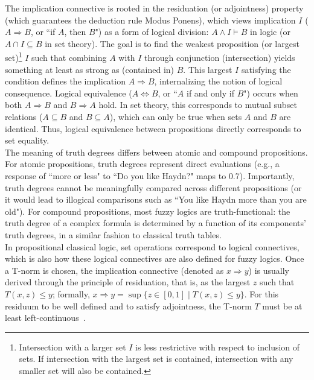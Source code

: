 The implication connective is rooted in the residuation (or adjointness) property (which guarantees the deduction rule Modus Ponens), which views implication $I$ ($A \Rightarrow B$, or ``if $A$, then $B$") as a form of logical division: $A \land I \models B$ in logic (or $A \cap I \subseteq B$ in set theory). The goal is to find the weakest proposition (or largest set)\footnote{Intersection with a larger set $I$ is less restrictive with respect to inclusion of sets. If intersection with the largest set is contained, intersection with any smaller set will also be contained.} $I$ such that combining $A$ with $I$ through conjunction (intersection) yields something at least as strong as (contained in) $B$. This largest $I$ satisfying the condition defines the implication $A \Rightarrow B$, internalizing the notion of logical consequence. Logical equivalence ($A \iff B$, or ``$A$ if and only if $B$") occurs when both $A \Rightarrow B$ and $B \Rightarrow A$ hold. In set theory, this corresponds to mutual subset relations ($A \subseteq B$ and $B \subseteq A$), which can only be true when sets $A$ and $B$ are identical. Thus, logical equivalence between propositions directly corresponds to set equality.\\

The meaning of truth degrees differs between atomic and compound propositions. For atomic propositions, truth degrees represent direct evaluations (e.g., a response of ``more or less" to ``Do you like Haydn?" maps to 0.7). Importantly, truth degrees cannot be meaningfully compared across different propositions (or it would lead to illogical comparisons such as ``You like Haydn more than you are old"). For compound propositions, most fuzzy logics are truth-functional: the truth degree of a complex formula is determined by a function of its components' truth degrees, in a similar fashion to classical truth tables.\\

In propositional classical logic, set operations correspond to logical connectives, which is also how these logical connectives are also defined for fuzzy logics. Once a T-norm is chosen, the implication connective (denoted as $x \Rightarrow y$) is usually derived through the principle of residuation, that is, as the largest $z$ such that $T(x, z) \le y$; formally, $x \Rightarrow y = \sup\{z \in [0,1] \mid T(x, z) \le y\}$. For this residuum to be well defined and to satisfy adjointness, the T-norm $T$ must be at least left-continuous~\cite[p.272]{GodoMonoidal}.\\

